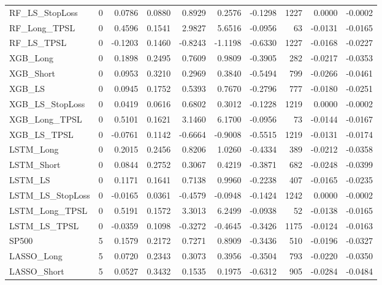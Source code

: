 \begin{tabular}{llrrrrrrrr}
\cline{1-10}
RF\_LS\_StopLoss & 0 & 0.0786 & 0.0880 & 0.8929 & 0.2576 & -0.1298 & 1227 & 0.0000 & -0.0002 \\
\cline{1-10}
RF\_Long\_TPSL & 0 & 0.4596 & 0.1541 & 2.9827 & 5.6516 & -0.0956 & 63 & -0.0131 & -0.0165 \\
\cline{1-10}
RF\_LS\_TPSL & 0 & -0.1203 & 0.1460 & -0.8243 & -1.1198 & -0.6330 & 1227 & -0.0168 & -0.0227 \\
\cline{1-10}
XGB\_Long & 0 & 0.1898 & 0.2495 & 0.7609 & 0.9809 & -0.3905 & 282 & -0.0217 & -0.0353 \\
\cline{1-10}
XGB\_Short & 0 & 0.0953 & 0.3210 & 0.2969 & 0.3840 & -0.5494 & 799 & -0.0266 & -0.0461 \\
\cline{1-10}
XGB\_LS & 0 & 0.0945 & 0.1752 & 0.5393 & 0.7670 & -0.2796 & 777 & -0.0180 & -0.0251 \\
\cline{1-10}
XGB\_LS\_StopLoss & 0 & 0.0419 & 0.0616 & 0.6802 & 0.3012 & -0.1228 & 1219 & 0.0000 & -0.0002 \\
\cline{1-10}
XGB\_Long\_TPSL & 0 & 0.5101 & 0.1621 & 3.1460 & 6.1700 & -0.0956 & 73 & -0.0144 & -0.0167 \\
\cline{1-10}
XGB\_LS\_TPSL & 0 & -0.0761 & 0.1142 & -0.6664 & -0.9008 & -0.5515 & 1219 & -0.0131 & -0.0174 \\
\cline{1-10}
LSTM\_Long & 0 & 0.2015 & 0.2456 & 0.8206 & 1.0260 & -0.4334 & 389 & -0.0212 & -0.0358 \\
\cline{1-10}
LSTM\_Short & 0 & 0.0844 & 0.2752 & 0.3067 & 0.4219 & -0.3871 & 682 & -0.0248 & -0.0399 \\
\cline{1-10}
LSTM\_LS & 0 & 0.1171 & 0.1641 & 0.7138 & 0.9960 & -0.2238 & 407 & -0.0165 & -0.0235 \\
\cline{1-10}
LSTM\_LS\_StopLoss & 0 & -0.0165 & 0.0361 & -0.4579 & -0.0948 & -0.1424 & 1242 & 0.0000 & -0.0002 \\
\cline{1-10}
LSTM\_Long\_TPSL & 0 & 0.5191 & 0.1572 & 3.3013 & 6.2499 & -0.0938 & 52 & -0.0138 & -0.0165 \\
\cline{1-10}
LSTM\_LS\_TPSL & 0 & -0.0359 & 0.1098 & -0.3272 & -0.4645 & -0.3426 & 1175 & -0.0124 & -0.0163 \\
\cline{1-10}
SP500 & 5 & 0.1579 & 0.2172 & 0.7271 & 0.8909 & -0.3436 & 510 & -0.0196 & -0.0327 \\
\cline{1-10}
LASSO\_Long & 5 & 0.0720 & 0.2343 & 0.3073 & 0.3956 & -0.3504 & 793 & -0.0220 & -0.0350 \\
\cline{1-10}
LASSO\_Short & 5 & 0.0527 & 0.3432 & 0.1535 & 0.1975 & -0.6312 & 905 & -0.0284 & -0.0484 \\

\end{tabular}
